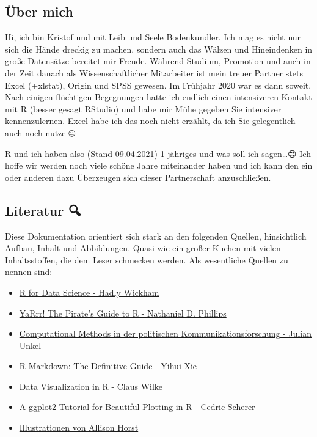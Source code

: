 \documentclass[
]{article}
\providecommand{\tightlist}{%
  \setlength{\itemsep}{0pt}\setlength{\parskip}{0pt}}
\begin{document}
\hypertarget{uxfcber-mich}{%
\subsection{Über mich}\label{uxfcber-mich}}

Hi, ich bin Kristof und mit Leib und Seele Bodenkundler. Ich mag es nicht nur sich die Hände dreckig zu machen, sondern auch das Wälzen und Hineindenken in große Datensätze bereitet mir Freude. Während Studium, Promotion und auch in der Zeit danach als Wissenschaftlicher Mitarbeiter ist mein treuer Partner stets Excel (+xlstat), Origin und SPSS gewesen. Im Frühjahr 2020 war es dann soweit. Nach einigen flüchtigen Begegnungen hatte ich endlich einen intensiveren Kontakt mit R (besser gesagt RStudio) und habe mir Mühe gegeben Sie intensiver kennenzulernen. Excel habe ich das noch nicht erzählt, da ich Sie gelegentlich auch noch nutze 🤐

R und ich haben also (Stand 09.04.2021) 1-jähriges und was soll ich sagen\ldots😍 Ich hoffe wir werden noch viele schöne Jahre miteinander haben und ich kann den ein oder anderen dazu Überzeugen sich dieser Partnerschaft anzuschließen.

\hypertarget{literatur}{%
\subsection{Literatur 🔍}\label{literatur}}

Diese Dokumentation orientiert sich stark an den folgenden Quellen, hinsichtlich Aufbau, Inhalt und Abbildungen. Quasi wie ein großer Kuchen mit vielen Inhaltsstoffen, die dem Leser schmecken werden. Als wesentliche Quellen zu nennen sind:

\begin{itemize}
\tightlist
\item
  \href{https://r4ds.had.co.nz/index.html}{R for Data Science - Hadly Wickham}
\item
  \href{https://bookdown.org/ndphillips/YaRrr/}{YaRrr! The Pirate's Guide to R - Nathaniel D. Phillips}
\item
  \href{https://bookdown.org/joone/ComputationalMethods/}{Computational Methods in der politischen Kommunikationsforschung - Julian Unkel}
\item
  \href{https://bookdown.org/yihui/rmarkdown/}{R Markdown: The Definitive Guide - Yihui Xie}
\item
  \href{https://wilkelab.org/SDS375/}{Data Visualization in R - Claus Wilke}
\item
  \href{https://www.cedricscherer.com/2019/08/05/a-ggplot2-tutorial-for-beautiful-plotting-in-r/\#colors}{A ggplot2 Tutorial for Beautiful Plotting in R - Cedric Scherer}
\item
  \href{https://github.com/allisonhorst/stats-illustrations}{Illustrationen von Allison Horst}
\end{itemize}
\end{document}
